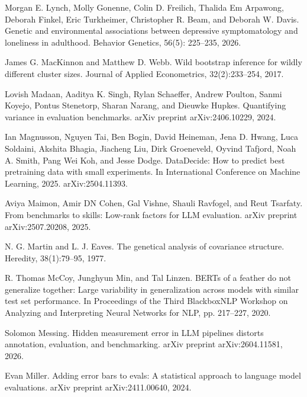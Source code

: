 \noindent Morgan E. Lynch, Molly Gonenne, Colin D. Freilich, Thalida Em Arpawong, Deborah Finkel, Eric Turkheimer, Christopher R. Beam, and Deborah W. Davis. Genetic and environmental associations between depressive symptomatology and loneliness in adulthood. Behavior Genetics, 56(5): 225--235, 2026.\par\medskip

\noindent James G. MacKinnon and Matthew D. Webb. Wild bootstrap inference for wildly different cluster sizes. Journal of Applied Econometrics, 32(2):233--254, 2017.\par\medskip

\noindent Lovish Madaan, Aaditya K. Singh, Rylan Schaeffer, Andrew Poulton, Sanmi Koyejo, Pontus Stenetorp, Sharan Narang, and Dieuwke Hupkes. Quantifying variance in evaluation benchmarks. arXiv preprint arXiv:2406.10229, 2024.\par\medskip

\noindent Ian Magnusson, Nguyen Tai, Ben Bogin, David Heineman, Jena D. Hwang, Luca Soldaini, Akshita Bhagia, Jiacheng Liu, Dirk Groeneveld, Oyvind Tafjord, Noah A. Smith, Pang Wei Koh, and Jesse Dodge. DataDecide: How to predict best pretraining data with small experiments. In International Conference on Machine Learning, 2025. arXiv:2504.11393.\par\medskip

\noindent Aviya Maimon, Amir DN Cohen, Gal Vishne, Shauli Ravfogel, and Reut Tsarfaty. From benchmarks to skills: Low-rank factors for LLM evaluation. arXiv preprint arXiv:2507.20208, 2025.\par\medskip

\noindent N. G. Martin and L. J. Eaves. The genetical analysis of covariance structure. Heredity, 38(1):79--95, 1977.\par\medskip

\noindent R. Thomas McCoy, Junghyun Min, and Tal Linzen. BERTs of a feather do not generalize together: Large variability in generalization across models with similar test set performance. In Proceedings of the Third BlackboxNLP Workshop on Analyzing and Interpreting Neural Networks for NLP, pp. 217--227, 2020.\par\medskip

\noindent Solomon Messing. Hidden measurement error in LLM pipelines distorts annotation, evaluation, and benchmarking. arXiv preprint arXiv:2604.11581, 2026.\par\medskip

\noindent Evan Miller. Adding error bars to evals: A statistical approach to language model evaluations. arXiv preprint arXiv:2411.00640, 2024.\par\medskip

